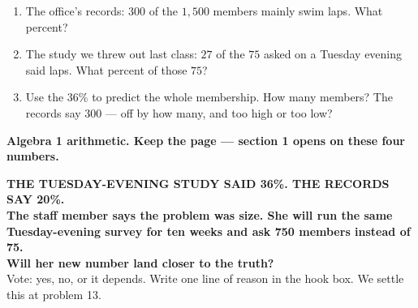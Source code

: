 \documentclass[aspectratio=169, 11pt]{beamer}
\begin{document}
\begin{frame}[t, plain]
  \vspace{0.3cm}
  \begin{center}
    \begin{minipage}{0.86\textwidth}
      \begin{enumerate}\setlength{\itemsep}{7pt}
        \item The office's records: $300$ of the $1{,}500$ members mainly swim laps. What percent?
        \item The study we threw out last class: $27$ of the $75$ asked on a Tuesday evening said
              laps. What percent of those $75$?
        \item Use the $36\%$ to predict the whole membership. How many members? The records say
              $300$ --- off by how many, and too high or too low?
      \end{enumerate}
    \end{minipage}
  \end{center}
  \vspace{0.4cm}
  \begin{center}
    {\color{cerulean}\bfseries Algebra 1 arithmetic. Keep the page --- section 1 opens on these
    four numbers.}
  \end{center}
\end{frame}

{
\begin{frame}[plain]
  \vspace{1.2cm}
  \begin{center}
    {\color{frostmid}\bfseries\small THE TUESDAY-EVENING STUDY SAID 36\%. THE RECORDS SAY 20\%.}\\[0.7cm]
    {\color{white}\bfseries\Large The staff member says the problem was size. She will run the
    same Tuesday-evening survey for ten weeks and ask 750 members instead of 75.}\\[0.9cm]
    {\color{goldacc}\bfseries\large Will her new number land closer to the truth?}\\[0.5cm]
    {\color{frostmid}\small Vote: yes, no, or it depends. Write one line of reason in the hook
    box. We settle this at problem 13.}
  \end{center}
\end{frame}
}
\end{document}
